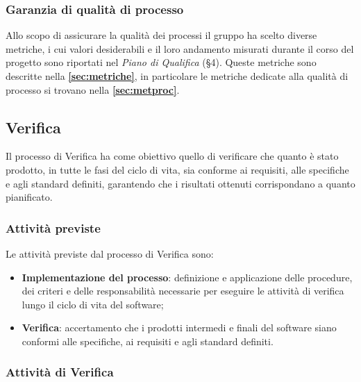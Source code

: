 \documentclass[a4paper,12pt]{article}
\begin{document}
        \subsubsection{Garanzia di qualità di processo}
            Allo scopo di assicurare la qualità dei processi il gruppo ha scelto diverse metriche, i cui valori desiderabili e il loro andamento misurati durante il corso del progetto sono riportati nel \textit{Piano di Qualifica} (\S4).
            Queste metriche sono descritte nella \textbf{\autoref{sec:metriche}}, in particolare le metriche dedicate alla qualità di processo si trovano nella \textbf{\autoref{sec:metproc}}.

    \subsection{Verifica}
        Il processo di Verifica ha come obiettivo quello di verificare che quanto è stato prodotto, in tutte le fasi del ciclo di vita, sia conforme ai requisiti, alle specifiche e agli standard definiti, garantendo che i risultati ottenuti corrispondano a quanto pianificato.

        \subsubsection{Attività previste}
            Le attività previste dal processo di Verifica sono:
            \begin{itemize}
                \item \textbf{Implementazione del processo}: definizione e applicazione delle procedure, dei criteri e delle responsabilità necessarie per eseguire le attività di verifica lungo il ciclo di vita del software;
                \item \textbf{Verifica}: accertamento che i prodotti intermedi e finali del software siano conformi alle specifiche, ai requisiti e agli standard definiti.
            \end{itemize}

        \subsubsection{Attività di Verifica}
    
\end{document}
